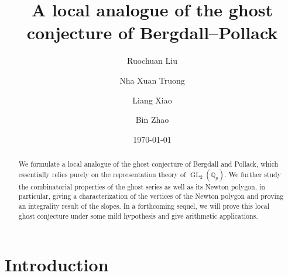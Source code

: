 \documentclass[12pt]{amsart}
\theoremstyle{definition}
\numberwithin{equation}{subsection}
\def\QQ{\mathbb{Q}}
\DeclareMathOperator{\GL}{GL}
\begin{document}
 
\title{A local analogue of the ghost conjecture of Bergdall--Pollack}
\author{Ruochuan Liu}
\address{Ruochuan Liu, School of Mathematical Sciences, Peking University, 5 Yi He Yuan Road, Haidian District, Beijing, 100871, China. }

\author{Nha Xuan Truong}
\address{Nha Xuan Truong, Department of Mathematics, University of Hawaii at Manoa, 2565 McCarthy Mall, Honolulu, HI 96822, U.S.A..}

\author{Liang Xiao}
\address{Liang Xiao, School of Mathematical Sciences,
Peking University.
5 Yi He Yuan Road, Haidian District,
Beijing, 100871, China.}

\author{Bin Zhao}
\address{Bin Zhao, School of Mathematical Sciences, Capital Normal University, Beijing, 100048, China.}
\date{\today}

\begin{abstract}
We formulate a local analogue of the ghost conjecture of Bergdall and Pollack, which essentially relies purely on the representation theory of $\GL_2(\QQ_p)$.  We further study the combinatorial properties of the ghost series as well as its Newton polygon, in particular, giving a characterization of the vertices of the Newton polygon and proving an integrality result of the slopes.
In a forthcoming sequel, we will prove this local ghost conjecture under some mild hypothesis and give arithmetic applications.
\end{abstract}  

\maketitle
\setcounter{tocdepth}{1}
\tableofcontents


\section{Introduction}
\end{document}
